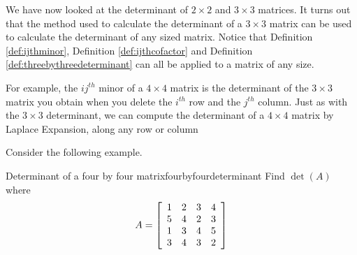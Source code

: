 We have now looked at the determinant of $2 \times 2$ and $3 \times 3$ matrices. It turns
out that the method used to calculate the determinant of a $3 \times 3$ matrix 
can be used to calculate the determinant of any sized matrix. Notice that
Definition \ref{def:ijthminor}, Definition \ref{def:ijthcofactor} and Definition \ref{def:threebythreedeterminant}
can all be applied to a matrix of any size. 

For example, the $ij^{th}$ minor of a $4 \times 4$ matrix is the determinant
of the $3 \times 3$ matrix you obtain when you delete the $i^{th}$ row and the $j^{th}$ column. 
Just as with the $3 \times 3$ determinant, we can compute the determinant of a $4 \times 4$ matrix by Laplace Expansion, 
along any row or column

Consider the following example. 

\begin{example}{Determinant of a four by four matrix}{fourbyfourdeterminant}
Find $\det \left( A\right) $ where
\begin{equation*}
A=\left[
\begin{array}{rrrr}
1 & 2 & 3 & 4 \\
5 & 4 & 2 & 3 \\
1 & 3 & 4 & 5 \\
3 & 4 & 3 & 2
\end{array}
\right]
\end{equation*}
\end{example}

